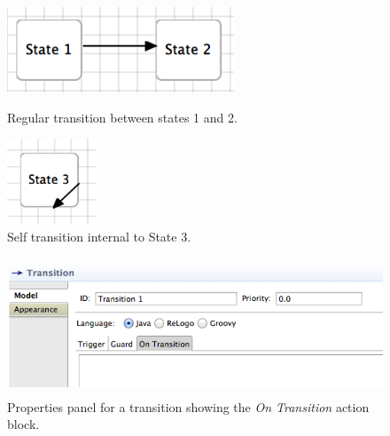 \documentclass[11pt]{amsart}
\begin{document}
\begin{figure}

\begin{minipage}{.5\textwidth}
\begin{center}
\vspace{.2in}
\centerline {
\includegraphics[height=1in]{StatechartsImages/RegularTransition.png}
}
\caption{Regular transition between states 1 and 2.}
\label{fig:regularTransition}
\end{center}
\end{minipage}%
\begin{minipage}{.5\textwidth}
\begin{center}
\vspace{.2in}
\centerline {
\includegraphics[height=1in]{StatechartsImages/SelfTransition.png}
}
\caption{Self transition internal to State 3.}
\label{fig:selfTransition}
\end{center}
\end{minipage}

\end{figure}

\begin{figure}
\begin{center}
\vspace{.2in}
\centerline {
\includegraphics[height=1.6in]{StatechartsImages/TransitionPropertiesOnTransition.png}
}
\caption{Properties panel for a transition showing the \emph{On Transition} action block.}
\label{fig:transitionPropertiesOnTransition}
\end{center}
\end{figure}
\end{document}
